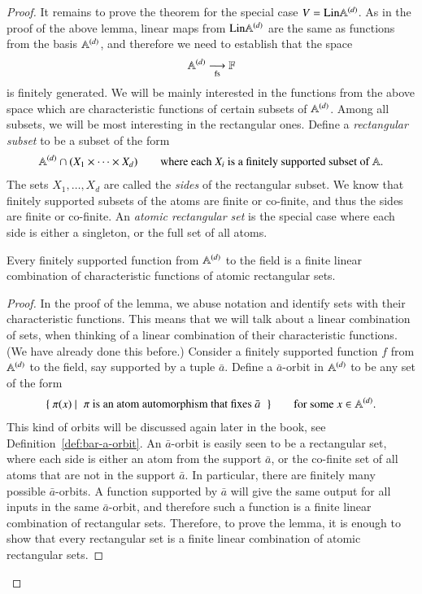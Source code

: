 \begin{proof}
    It remains to prove the theorem for the special case $V =  \mathrm{Lin} \mathbb A^{(d)}$. As in the proof of the above lemma, linear maps from $\mathrm{Lin} \mathbb A^{(d)}$ are the same as functions from the basis $\mathbb A^{(d)}$, and therefore we need to establish that the space 
    \begin{align*}
    \mathbb A^{(d)} \underset{\text{fs}}{\longrightarrow} \mathbb F
    \end{align*}
    is finitely generated. 
    We will be mainly interested in the functions from the above space which are  characteristic functions of certain subsets of  $\mathbb A^{(d)}$. Among all subsets, we will be most interesting in the rectangular ones.  Define a    \emph{rectangular subset}  to be a subset of the form 
    \begin{align*}
    \mathbb A^{(d)} \cap (X_1 \times \cdots \times X_d)
    \qquad \text{where each $X_i$ is a finitely supported subset of $\mathbb A$.}
    \end{align*}
    The sets $X_1,\ldots,X_d$ are called the \emph{sides} of the rectangular subset. We know that finitely supported subsets of the atoms are finite or co-finite, and thus the sides are finite or co-finite. 
    An \emph{atomic rectangular set} is the special case where each side is either a singleton, or the full set of all atoms.  
    
    \begin{lemma}\label{lem:rectangular-set}
        Every finitely supported function from $\mathbb A^{(d)}$ to the field is a finite linear combination of characteristic functions of atomic rectangular sets.
    \end{lemma}
    \begin{proof}
        In the proof of the lemma, we abuse notation and identify sets with their characteristic functions. This means that we will talk about a linear combination of sets, when thinking of a  linear combination of their characteristic functions. (We have already done this before.)
        Consider a finitely supported function $f$ from $\mathbb A^{(d)}$ to the field, say supported by a tuple $\bar a$. Define a $\bar a$-orbit in  $\mathbb A^{(d)}$ to be any set of the form 
        \begin{align*}
        \setbuild{ \pi(x)}{$\pi$ is an atom automorphism that fixes $\bar a$} \qquad \text{for some $x \in \atoms^{(d)}$}.
        \end{align*}
        This kind of orbits will be discussed again later in the book, see Definition~\ref{def:bar-a-orbit}.
        An $\bar a$-orbit is easily seen to be a rectangular set, where each side is either an atom from the support $\bar a$, or the co-finite set of all atoms that are not in the support $\bar a$. In particular, there are finitely many possible $\bar a$-orbits. A function supported by $\bar a$ will give the same output for all inputs in the same $\bar a$-orbit, and therefore such a function is a finite linear combination of rectangular sets. Therefore, to prove the lemma, it is enough to show that every rectangular set is a finite linear combination of atomic rectangular sets.
        

\end{proof}
\end{proof}
